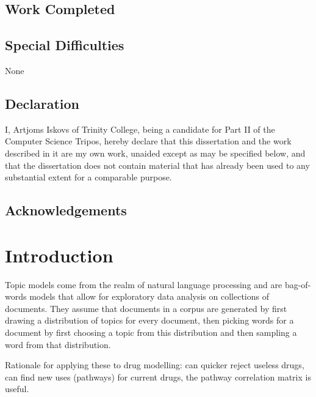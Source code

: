 \documentclass[12pt,a4paper,twoside,openright]{report}
\begin{document}
\section*{Work Completed}

\section*{Special Difficulties}
None
 
\newpage
\section*{Declaration}

I, Artjoms Iskovs of Trinity College, being a candidate for Part II of the Computer
Science Tripos, hereby declare that this dissertation and the work described in it are my own work,
unaided except as may be specified below, and that the dissertation does not contain material that has already been used to any substantial
extent for a comparable purpose.

\bigskip
{}

\medskip
{}

\tableofcontents

\listoffigures

\newpage
\section*{Acknowledgements}



\pagestyle{headings}

\chapter{Introduction}

Topic models come from the realm of natural language processing and are bag-of-words models that allow for exploratory data analysis on collections of documents. They assume that documents in a corpus are generated by first drawing a distribution of topics for every document, then picking words for a document by first choosing a topic from this distribution and then sampling a word from that distribution.

Rationale for applying these to drug modelling: can quicker reject useless drugs, can find new uses (pathways) for current drugs, the pathway correlation matrix is useful.
\end{document}
